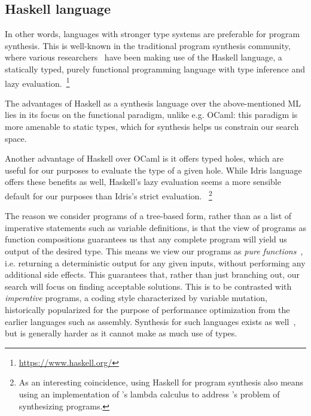 \documentclass{article}
\begin{document}

\subsection{Haskell language}

In other words, languages with stronger type systems are preferable for program synthesis.
This is well-known in the traditional program synthesis community,
where various researchers~\citep{synquid,hornclauses,scythe,gissurarson2018suggesting}
have been making use of the Haskell language,
a statically typed, purely functional programming language with type inference and lazy evaluation.~\footnote{\url{https://www.haskell.org/}}

The advantages of Haskell as a synthesis language over the above-mentioned ML lies in its focus on the functional paradigm,
unlike e.g. OCaml: this paradigm is more amenable to static types, which for synthesis helps us constrain our search space.

Another advantage of Haskell over OCaml is it offers typed holes, which are useful for our purposes to evaluate the type of a given hole.
While Idris language offers these benefits as well, Haskell's lazy evaluation seems a more sensible default for our purposes than Idris's strict evaluation.
~\footnote{As an interesting coincidence, using Haskell for program synthesis also means using an implementation of \citet{lambdacalculus}'s lambda calculus to address \citet{church1957applications}'s problem of synthesizing programs.}

The reason we consider programs of a tree-based form, rather than as a list of imperative statements such as variable definitions,
is that the view of programs as function compositions guarantees us that any complete program will yield us output of the desired type.
This means we view our programs as \emph{pure functions}~\citep{fortran95},
i.e. returning a deterministic output for any given inputs, without performing any additional side effects.
This guarantees that, rather than just branching out, our search will focus on finding acceptable solutions.
This is to be contrasted with \emph{imperative} programs, a coding style characterized by variable mutation,
historically popularized for the purpose of performance optimization from the earlier languages such as assembly.
Synthesis for such languages exists as well~\citep{shi2019frangel}, but is generally harder as it cannot make as much use of types.
\end{document}
